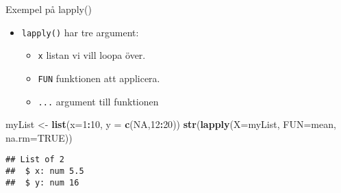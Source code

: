 \documentclass[
  11pt,
  ignorenonframetext,
]{beamer}
\newenvironment{Shaded}{\begin{snugshade}}{\end{snugshade}}
\newcommand{\AttributeTok}[1]{\textcolor[rgb]{0.13,0.29,0.53}{#1}}
\newcommand{\ConstantTok}[1]{\textcolor[rgb]{0.56,0.35,0.01}{#1}}
\newcommand{\DecValTok}[1]{\textcolor[rgb]{0.00,0.00,0.81}{#1}}
\newcommand{\FunctionTok}[1]{\textcolor[rgb]{0.13,0.29,0.53}{\textbf{#1}}}
\newcommand{\NormalTok}[1]{#1}
\newcommand{\OtherTok}[1]{\textcolor[rgb]{0.56,0.35,0.01}{#1}}
\newcommand{\SpecialCharTok}[1]{\textcolor[rgb]{0.81,0.36,0.00}{\textbf{#1}}}
\providecommand{\tightlist}{%
  \setlength{\itemsep}{0pt}\setlength{\parskip}{0pt}}
\begin{document}
\begin{frame}[fragile]{Exempel på lapply()}
\label{exempel-puxe5-lapply}
\begin{itemize}
\tightlist
\item
  \texttt{lapply()} har tre argument:

  \begin{itemize}
  \tightlist
  \item
    \texttt{x} listan vi vill loopa över.
  \item
    \texttt{FUN} funktionen att applicera.
  \item
    \texttt{...} argument till funktionen
  \end{itemize}
\end{itemize}

\begin{Shaded}
\begin{Highlighting}[]
\NormalTok{myList }\OtherTok{\textless{}{-}} \FunctionTok{list}\NormalTok{(}\AttributeTok{x=}\DecValTok{1}\SpecialCharTok{:}\DecValTok{10}\NormalTok{, }\AttributeTok{y =} \FunctionTok{c}\NormalTok{(}\ConstantTok{NA}\NormalTok{,}\DecValTok{12}\SpecialCharTok{:}\DecValTok{20}\NormalTok{))}
\FunctionTok{str}\NormalTok{(}\FunctionTok{lapply}\NormalTok{(}\AttributeTok{X=}\NormalTok{myList, }\AttributeTok{FUN=}\NormalTok{mean, }\AttributeTok{na.rm=}\ConstantTok{TRUE}\NormalTok{))}
\end{Highlighting}
\end{Shaded}

\begin{verbatim}
## List of 2
##  $ x: num 5.5
##  $ y: num 16
\end{verbatim}


\end{frame}
\end{document}
